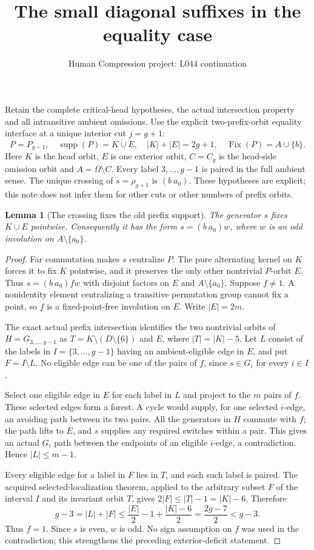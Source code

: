 \documentclass[11pt,a4paper]{article}
\title{The small diagonal suffixes in the equality case}
\author{Human Compression project: L044 continuation}
\date{}
\newtheorem{lemma}[theorem]{Lemma}
\begin{document}
\maketitle
Retain the complete critical-head hypotheses, the actual intersection
property and all intransitive ambient omissions. Use the explicit
two-prefix-orbit equality interface at a unique interior cut $j=g+1$:
\[
 P=P_{g-1},\quad \operatorname{supp}(P)=K\mathbin{\dot\cup}E,
 \quad |K|+|E|=2g+1,\quad
 \operatorname{Fix}(P)=A\cup\{b\}.
\]
Here $K$ is the head orbit, $E$ is one exterior orbit, $C=C_g$
is the head-side omission orbit and $A=\Omega\setminus C$.
Every label $3,\ldots,g-1$ is paired in the full ambient sense.
The unique crossing of $s=\rho_{g+1}$ is $(b\ a_0)$.
These hypotheses are explicit; this note does not infer them for
other cuts or other numbers of prefix orbits.

\begin{lemma}[The crossing fixes the old prefix support]\label{pure}
The generator $s$ fixes $K\cup E$ pointwise. Consequently it has
the form $s=(b\ a_0)w$, where $w$ is an odd involution on
$A\setminus\{a_0\}$.
\end{lemma}
\begin{proof}
Far commutation makes $s$ centralize $P$. The pure alternating
kernel on $K$ forces it to fix $K$ pointwise, and it preserves
the only other nontrivial $P$-orbit $E$. Thus
$s=(b\ a_0)fw$ with disjoint factors on $E$ and
$A\setminus\{a_0\}$. Suppose $f\ne1$. A nonidentity element
centralizing a transitive permutation group cannot fix a point,
so $f$ is a fixed-point-free involution on $E$. Write $|E|=2m$.

The exact actual prefix intersection identifies the two nontrivial
orbits of $H=G_{3,\ldots,g-1}$ as $T=K\setminus
(D\setminus\{6\})$ and $E$, where $|T|=|K|-5$.
Let $L$ consist of the labels in $I=\{3,\ldots,g-1\}$
having an ambient-eligible edge in $E$, and put $F=I\setminus L$.
No eligible edge can be one of the pairs of $f$, since
$s\in G_i$ for every $i\in I$.

Select one eligible edge in $E$ for each label in $L$ and
project to the $m$ pairs of $f$. These selected edges form
a forest. A cycle would supply, for one selected $i$-edge,
an avoiding path between its two pairs. All the generators
in $H$ commute with $f$; the path lifts to $E$, and $s$
supplies any required switches within a pair. This gives
an actual $G_i$ path between the endpoints of an eligible
$i$-edge, a contradiction. Hence $|L|\le m-1$.

Every eligible edge for a label in $F$ lies in $T$, and each
such label is paired. The acquired selected-localization
theorem, applied to the arbitrary subset $F$ of the interval
$I$ and its invariant orbit $T$, gives
$2|F|\le |T|-1=|K|-6$. Therefore
\[
 g-3=|L|+|F|\le \frac{|E|}{2}-1+\frac{|K|-6}{2}
       =\frac{2g-7}{2}<g-3.
\]
Thus $f=1$. Since $s$ is even, $w$ is odd.
No sign assumption on $f$ was used in the contradiction;
this strengthens the preceding exterior-deficit statement.
\end{proof}
\end{document}
